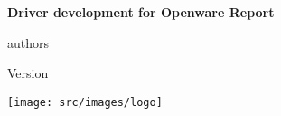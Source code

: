 \documentclass[oneside]{book}
\title{}
\author{}
\date{%
    \today

    Version: 0.1.1

    \begin{figure}
        \centering
        \texttt{[image: src/images/logo]}
    \end{figure}
}
\begin{document}
\begin{titlepage}
    \centering
    \vfill
    {\bfseries\Large
        Driver development for Openware Report
        
        \vskip2cm

        authors
        
        \vskip2cm

        Version
        \\
    }    
    \vfill
    \texttt{[image: src/images/logo]}
    \vfill
    \vfill
\end{titlepage}
\clearpage

\tableofcontents
\clearpage


 

\frontmatter


\clearpage


\mainmatter


\clearpage


\backmatter


\end{document}
